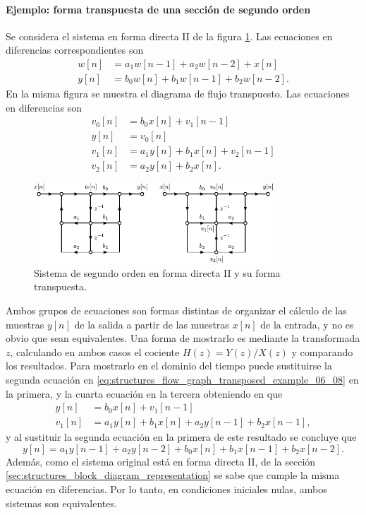 \documentclass[a4paper]{report}
\begin{document}
\paragraph{Ejemplo: forma transpuesta de una sección de segundo orden} Se considera el sistema en forma directa II de la figura \ref{fig:structures_flow_graph_transposed_example_06_08}. Las ecuaciones en diferencias correspondientes son
\begin{align*}
 w[n]&=a_1w[n-1]+a_2w[n-2]+x[n]\\
 y[n]&=b_0w[n]+b_1w[n-1]+b_2w[n-2].
\end{align*}
En la misma figura se muestra el diagrama de flujo transpuesto. Las ecuaciones en diferencias son
\begin{equation}\label{eq:structures_flow_graph_transposed_example_06_08}
 \begin{aligned}
  v_0[n]&=b_0x[n]+v_1[n-1]\\
  y[n]&=v_0[n]\\
  v_1[n]&=a_1y[n]+b_1x[n]+v_2[n-1]\\
  v_2[n]&=a_2y[n]+b_2x[n].  
 \end{aligned}
\end{equation}
\begin{figure}[!htb]
 \begin{center}
 \includegraphics[width=0.8\textwidth]{figuras/structures_flow_graph_transposed_example_06_08.pdf}
 \caption{\label{fig:structures_flow_graph_transposed_example_06_08} Sistema de segundo orden en forma directa II y su forma transpuesta.}
 \end{center}
\end{figure}
Ambos grupos de ecuaciones son formas distintas de organizar el cálculo de las muestras \(y[n]\) de la salida a partir de las muestras \(x[n]\) de la entrada, y no es obvio que sean equivalentes. Una forma de mostrarlo es mediante la transformada \(z\), calculando en ambos casos el cociente \(H(z)=Y(z)/X(z)\) y comparando los resultados. Para mostrarlo en el dominio del tiempo puede sustituirse la segunda ecuación en \ref{eq:structures_flow_graph_transposed_example_06_08} en la primera, y la cuarta ecuación en la tercera obteniendo en que 
\begin{align*}
 y[n]&=b_0x[n]+v_1[n-1]\\
 v_1[n]&=a_1y[n]+b_1x[n]+a_2y[n-1]+b_2x[n-1], 
\end{align*}
y al sustituir la segunda ecuación en la primera de este resultado se concluye que 
\[
 y[n]=a_1y[n-1]+a_2y[n-2]+b_0x[n]+b_1x[n-1]+b_2x[n-2].
\]
Además, como el sistema original está en forma directa II, de la sección \ref{sec:structures_block_diagram_representation} se sabe que cumple la misma ecuación en diferencias. Por lo tanto, en condiciones iniciales nulas, ambos sistemas son equivalentes.
\end{document}
